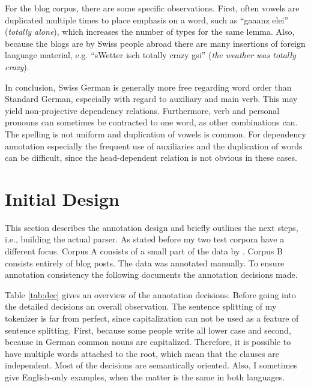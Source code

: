 \documentclass[11pt,letterpaper, covington]{article}
\begin{document}
For the blog corpus, there are some specific observations. First, often vowels are duplicated multiple times to place emphasis on a word, such as ``gaaanz elei'' (\emph{totally alone}), which increases the number of types for the same lemma. Also, because the blogs are by Swiss people abroad there are many insertions of foreign language material, e.g. ``sWetter isch totally crazy gsi'' (\emph{the weather was totally crazy}).

In conclusion, Swiss German is generally more free regarding word order than Standard German, especially with regard to auxiliary and main verb. This may yield non-projective dependency relations. Furthermore, verb and personal pronouns can sometimes be contracted to one word, as other combinations can. The spelling is not uniform and duplication of vowels is common. For dependency annotation especially the frequent use of auxiliaries and the duplication of words can be difficult, since the head-dependent relation is not obvious in these cases.


\section{Initial Design}

This section describes the annotation design and briefly outlines the next steps, i.e., building the actual parser. As stated before my two test corpora have a different focus. Corpus A consists of a small part of the data by \citet{AH12}. Corpus B consists entirely of blog posts. The data was annotated manually. To ensure annotation consistency the following documents the annotation decisions made.

Table \ref{tab:dec} gives an overview of the annotation decisions. Before going into the detailed decisions an overall observation. The sentence splitting of my tokenizer is far from perfect, since capitalization can not be used as a feature of sentence splitting. First, because some people write all lower case and second, because in German common nouns are capitalized. Therefore, it is possible to have multiple words attached to the root, which mean that the clauses are independent. Most of the decisions are semantically oriented. Also, I sometimes give English-only examples, when the matter is the same in both languages.
\end{document}

